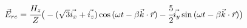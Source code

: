 \begin{solution}
$ \vec{E}_{re} =\cfrac{H_{z}}{Z}\big{(} -(\sqrt{3}\vec{i_{x}}+\vec{i_{z}})\cos{(\omega t - \beta\vec{k}\cdot\vec{r})} - \cfrac{5}{2}\vec{i_{y}}\sin{(\omega t - \beta\vec{k}\cdot\vec{r})}  \big{)}	$
					                   




\end{solution}